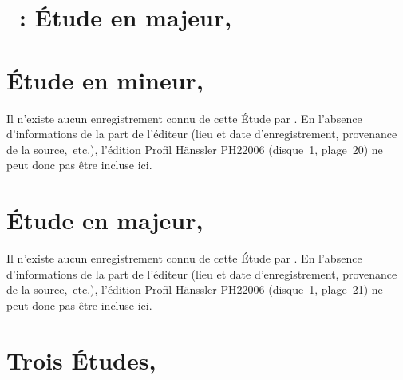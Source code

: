 
\section{\ifChrono \Scriabine{}~: \fi
Étude en \kD \Flat majeur,  }
\label{\thesection}

\begin{workitemize}
 \item{}
 \begin{perfitemize}
  \item{}
  \item{}
 \end{perfitemize}
\end{workitemize}

\section*{%
Étude en \kF mineur,  }

Il n'existe aucun enregistrement connu de cette Étude par \VSofronitsky{}.
En l'absence d'informations de la part de l'éditeur (lieu et date
d'enregistrement, provenance de la source,~etc.), l'édition Profil Hänssler
PH22006 (disque~1, plage~20) ne peut donc pas être incluse ici.

\section*{%
Étude en \kE \Flat majeur,  }

Il n'existe aucun enregistrement connu de cette Étude par \VSofronitsky{}.
En l'absence d'informations de la part de l'éditeur (lieu et date
d'enregistrement, provenance de la source,~etc.), l'édition Profil Hänssler
PH22006 (disque~1, plage~21) ne peut donc pas être incluse ici.

\section*{%
Trois Études, }


